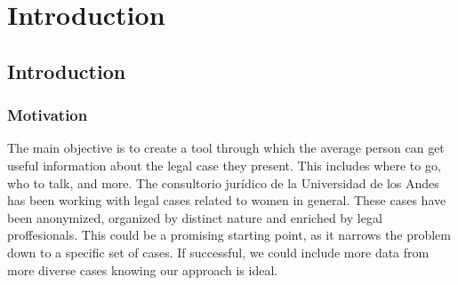 \chapter{Introduction}
\label{cha:introduction}




\section{Introduction}
\subsection{Motivation} 
The main objective is to create a tool through which the average person can get useful
information about the legal case they present. This includes where to go, who to talk,
and more.   %
The consultorio jurídico de la Universidad de los Andes has been working with 
legal cases related to women in general. These cases have been anonymized, organized 
by distinct nature and enriched by legal proffesionals. This could be a promising starting point, as it narrows the problem
down to a specific set of cases. If successful, we could include more data from more diverse
cases knowing our approach is ideal.

\endinput